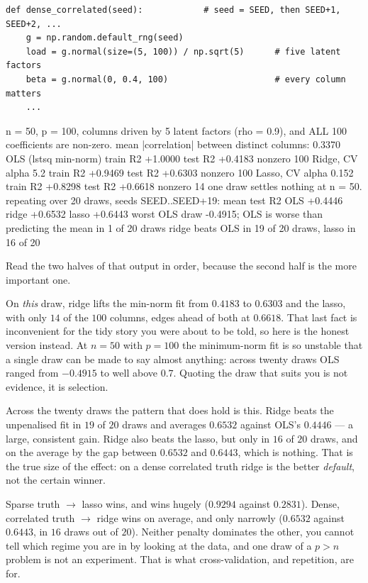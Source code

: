 \documentclass[11pt]{article}
\begin{document}
\begin{lstlisting}
def dense_correlated(seed):            # seed = SEED, then SEED+1, SEED+2, ...
    g = np.random.default_rng(seed)
    load = g.normal(size=(5, 100)) / np.sqrt(5)      # five latent factors
    beta = g.normal(0, 0.4, 100)                     # every column matters
    ...
\end{lstlisting}
\begin{codeout}
n = 50, p = 100, columns driven by 5 latent factors (rho = 0.9),
and ALL 100 coefficients are non-zero.
mean |correlation| between distinct columns: 0.3370
  OLS (lstsq min-norm)     train R2 +1.0000  test R2 +0.4183   nonzero 100
  Ridge, CV alpha 5.2      train R2 +0.9469  test R2 +0.6303   nonzero 100
  Lasso, CV alpha 0.152    train R2 +0.8298  test R2 +0.6618   nonzero  14
one draw settles nothing at n = 50. repeating over 20 draws,
seeds SEED..SEED+19:
  mean test R2   OLS +0.4446   ridge +0.6532   lasso +0.6443
  worst OLS draw -0.4915; OLS is worse than predicting the mean in 1 of 20 draws
  ridge beats OLS in 19 of 20 draws, lasso in 16 of 20
\end{codeout}

Read the two halves of that output in order, because the second half is the
more important one.

On \emph{this} draw, ridge lifts the min-norm fit from $0.4183$ to $0.6303$
and the lasso, with only $14$ of the $100$ columns, edges ahead of both at
$0.6618$. That last fact is inconvenient for the tidy story you were about to
be told, so here is the honest version instead. At $n = 50$ with $p = 100$ the
minimum-norm fit is so unstable that a single draw can be made to say almost
anything: across twenty draws OLS ranged from $-0.4915$ to well above $0.7$.
Quoting the draw that suits you is not evidence, it is selection.

Across the twenty draws the pattern that does hold is this. Ridge beats the
unpenalised fit in $19$ of $20$ draws and averages $0.6532$ against OLS's
$0.4446$ --- a large, consistent gain. Ridge also beats the lasso, but only in
$16$ of $20$ draws, and on the average by the gap between $0.6532$ and
$0.6443$, which is nothing. That is
the true size of the effect: on a dense correlated truth ridge is the better
\emph{default}, not the certain winner.

\begin{keyidea}
Sparse truth $\to$ lasso wins, and wins hugely ($0.9294$ against $0.2831$).
Dense, correlated truth $\to$ ridge wins on average, and only narrowly
($0.6532$ against $0.6443$, in $16$ draws out of $20$). Neither penalty
dominates the other, you cannot tell which regime you are in by looking at the
data, and one draw of a $p > n$ problem is not an experiment. That is what
cross-validation, and repetition, are for.
\end{keyidea}
\end{document}
